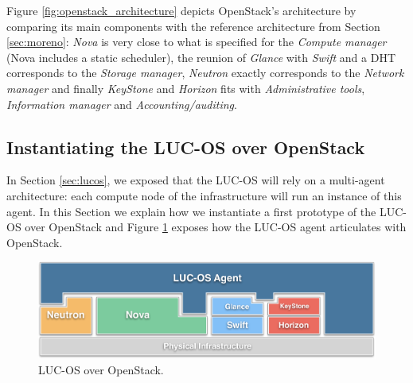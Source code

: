 Figure \ref{fig:openstack_architecture} depicts OpenStack's architecture by 
comparing its main components with the reference architecture from Section 
\ref{sec:moreno}: \emph{Nova} is very close to what is specified for the 
\emph{Compute manager} (Nova includes a static scheduler), the reunion of 
\emph{Glance} with \emph{Swift} and a DHT corresponds to the \emph{Storage 	
manager}, \emph{Neutron} exactly corresponds to the \emph{Network manager} and 
finally \emph{KeyStone} and \emph{Horizon} fits with 
\emph{Administrative tools}, \emph{Information manager} and 
\emph{Accounting/auditing}.

\subsection{Instantiating the LUC-OS over OpenStack}
\label{sub:sec:revisiting_openstack}


In Section \ref{sec:lucos}, we exposed that the LUC-OS will rely on a 
multi-agent architecture: each compute node of the infrastructure will run an
instance of this agent. In this Section we explain how we instantiate a first
prototype of the LUC-OS over OpenStack and Figure \ref{fig:luc_os_over_os} 
exposes how the LUC-OS agent articulates with OpenStack.

\begin{figure}
	\centerline{
	 \includegraphics[width=0.95\linewidth]{Figures/lucos_over_openstack.pdf}
  }
	\caption{LUC-OS over OpenStack.}%
	\label{fig:luc_os_over_os}%
\end{figure}

